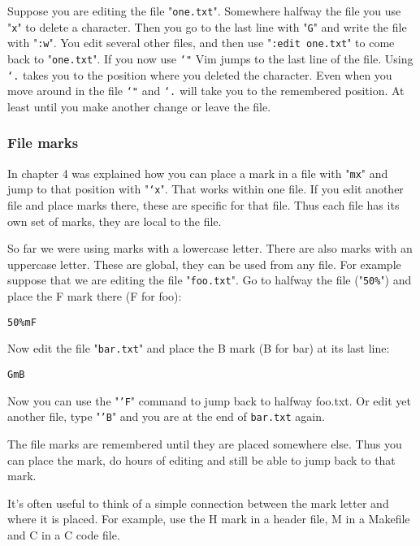 Suppose you are editing the file "\texttt{one.txt}".
Somewhere halfway the file you use "\texttt{x}" to delete a character.
Then you go to the last line with "\texttt{G}" and write the file with "\texttt{:w}".
You edit several other files, and then use "\texttt{:edit one.txt}" to come back to "\texttt{one.txt}".
If you now use \texttt{`"} Vim jumps to the last line of the file.
Using \texttt{`.} takes you to the position where you deleted the character.
Even when you move around in the file \texttt{`"} and \texttt{`.} will take you to the remembered position.
At least until you make another change or leave the file.

\subsubsection{File marks}
In chapter 4 was explained how you can place a mark in a file with "\texttt{mx}" and jump to that position with "\texttt{`x}".
That works within one file.
If you edit another file and place marks there, these are specific for that file.
Thus each file has its own set of marks, they are local to the file.

So far we were using marks with a lowercase letter.  There are also marks
with an uppercase letter.  These are global, they can be used from any file.
For example suppose that we are editing the file "\texttt{foo.txt}".  Go to halfway the
file ("\texttt{50\%}") and place the F mark there (F for foo):

 \begin{Verbatim}[samepage=true]
 50%mF
 \end{Verbatim}

Now edit the file "\texttt{bar.txt}" and place the B mark (B for bar) at its last line:

 \begin{Verbatim}[samepage=true]
 GmB
 \end{Verbatim}

Now you can use the "\texttt{'F}" command to jump back to halfway foo.txt.
Or edit yet another file, type "\texttt{'B}" and you are at the end of \texttt{bar.txt} again.

The file marks are remembered until they are placed somewhere else.
Thus you can place the mark, do hours of editing and still be able to jump back to that mark.

It's often useful to think of a simple connection between the mark letter and where it is placed.
For example, use the H mark in a header file, M in a Makefile and C in a C code file.

